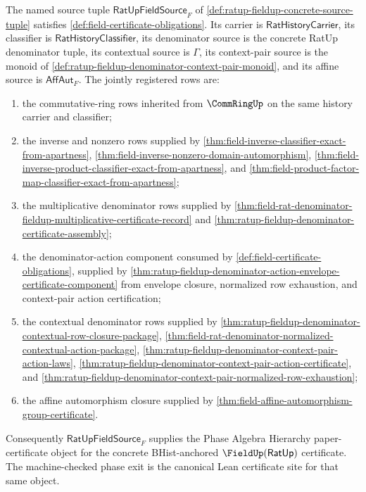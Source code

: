 \begin{theorem}
\label{thm:ratup-fieldup-assembled-certificate-boundary}
The named source tuple $\mathsf{RatUpFieldSource}_F$ of
\autoref{def:ratup-fieldup-concrete-source-tuple} satisfies
\autoref{def:field-certificate-obligations}. Its carrier is
$\mathsf{RatHistoryCarrier}$, its classifier is
$\mathsf{RatHistoryClassifier}$, its denominator source is the concrete
RatUp denominator tuple, its contextual source is $\Gamma$, its context-pair
source is the monoid of
\autoref{def:ratup-fieldup-denominator-context-pair-monoid}, and its affine
source is $\mathsf{AffAut}_F$. The jointly registered rows are:
\begin{enumerate}
  \item the commutative-ring rows inherited from $\CommRingUp$ on the same
  history carrier and classifier;
  \item the inverse and nonzero rows supplied by
  \autoref{thm:field-inverse-classifier-exact-from-apartness},
  \autoref{thm:field-inverse-nonzero-domain-automorphism},
  \autoref{thm:field-inverse-product-classifier-exact-from-apartness}, and
  \autoref{thm:field-product-factor-map-classifier-exact-from-apartness};
  \item the multiplicative denominator rows supplied by
  \autoref{thm:field-rat-denominator-fieldup-multiplicative-certificate-record}
  and \autoref{thm:ratup-fieldup-denominator-certificate-assembly};
  \item the denominator-action component consumed by
  \autoref{def:field-certificate-obligations}, supplied by
  \autoref{thm:ratup-fieldup-denominator-action-envelope-certificate-component}
  from envelope closure, normalized row exhaustion, and context-pair action
  certification;
  \item the contextual denominator rows supplied by
  \autoref{thm:ratup-fieldup-denominator-contextual-row-closure-package},
  \autoref{thm:field-rat-denominator-normalized-contextual-action-package},
  \autoref{thm:ratup-fieldup-denominator-context-pair-action-laws},
  \autoref{thm:ratup-fieldup-denominator-context-pair-action-certificate}, and
  \autoref{thm:ratup-fieldup-denominator-context-pair-normalized-row-exhaustion};
  \item the affine automorphism closure supplied by
  \autoref{thm:field-affine-automorphism-group-certificate}.
\end{enumerate}
Consequently $\mathsf{RatUpFieldSource}_F$ supplies the Phase Algebra
Hierarchy paper-certificate object for the concrete BHist-anchored
$\FieldUp(\mathsf{RatUp})$ certificate. The machine-checked phase exit is the
canonical Lean certificate site for that same object.
\end{theorem}
